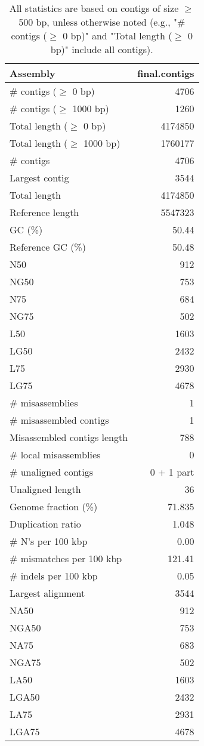 \documentclass[12pt,a4paper]{article}
\begin{document}
\begin{table}[ht]
\begin{center}
\caption{All statistics are based on contigs of size $\geq$ 500 bp, unless otherwise noted (e.g., "\# contigs ($\geq$ 0 bp)" and "Total length ($\geq$ 0 bp)" include all contigs).}
\begin{tabular}{|l*{1}{|r}|}
\hline
Assembly & final.contigs \\ \hline
\# contigs ($\geq$ 0 bp) & 4706 \\ \hline
\# contigs ($\geq$ 1000 bp) & 1260 \\ \hline
Total length ($\geq$ 0 bp) & 4174850 \\ \hline
Total length ($\geq$ 1000 bp) & 1760177 \\ \hline
\# contigs & 4706 \\ \hline
Largest contig & 3544 \\ \hline
Total length & 4174850 \\ \hline
Reference length & 5547323 \\ \hline
GC (\%) & 50.44 \\ \hline
Reference GC (\%) & 50.48 \\ \hline
N50 & 912 \\ \hline
NG50 & 753 \\ \hline
N75 & 684 \\ \hline
NG75 & 502 \\ \hline
L50 & 1603 \\ \hline
LG50 & 2432 \\ \hline
L75 & 2930 \\ \hline
LG75 & 4678 \\ \hline
\# misassemblies & 1 \\ \hline
\# misassembled contigs & 1 \\ \hline
Misassembled contigs length & 788 \\ \hline
\# local misassemblies & 0 \\ \hline
\# unaligned contigs & 0 + 1 part \\ \hline
Unaligned length & 36 \\ \hline
Genome fraction (\%) & 71.835 \\ \hline
Duplication ratio & 1.048 \\ \hline
\# N's per 100 kbp & 0.00 \\ \hline
\# mismatches per 100 kbp & 121.41 \\ \hline
\# indels per 100 kbp & 0.05 \\ \hline
Largest alignment & 3544 \\ \hline
NA50 & 912 \\ \hline
NGA50 & 753 \\ \hline
NA75 & 683 \\ \hline
NGA75 & 502 \\ \hline
LA50 & 1603 \\ \hline
LGA50 & 2432 \\ \hline
LA75 & 2931 \\ \hline
LGA75 & 4678 \\ \hline
\end{tabular}
\end{center}
\end{table}
\end{document}
